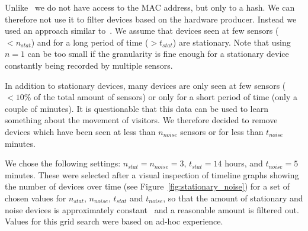 Unlike~\cite{largescalemonitoring} we do not have access to the MAC address, but only to a hash. We can therefore not use it to filter devices based on the hardware producer. Instead we used an approach similar to~\cite{monitorflows}. We assume that devices seen at few sensors ($<n_{stat}$) and for a long period of time ($>t_{stat}$) are stationary. Note that using $n=1$ can be too small if the granularity is fine enough for a stationary device constantly being recorded by multiple sensors.

In addition to stationary devices, many devices are only seen at few sensors ($<10\%$ of the total amount of sensors) or only for a short period of time (only a couple of minutes). It is questionable that this data can be used to learn something about the movement of visitors. We therefore decided to remove devices which have been seen at less than $n_{noise}$ sensors or for less than $t_{noise}$ minutes.

We chose the following settings: $n_{stat}=n_{noise}=3$, $t_{stat}=14$ hours, and $t_{noise}=5$ minutes.
These were selected after a visual inspection of timeline graphs showing the number of devices over time (see Figure~\ref{fig:stationary_noise}) for a set of chosen values for $n_{stat}$, $n_{noise}$, $t_{stat}$ and $t_{noise}$, so that the amount of stationary and noise devices is approximately constant~\cite{largescalemonitoring} and a reasonable amount is filtered out. Values for this grid search were based on ad-hoc experience.